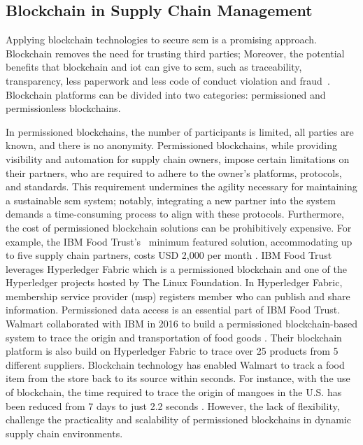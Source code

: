 \subsection{Blockchain in Supply Chain Management} \label{sec:lit_bc_in_scm}

Applying blockchain technologies to secure \gls{scm} is a promising approach. Blockchain removes the need for trusting third parties; Moreover, the potential benefits that blockchain and \gls{iot} can give to \gls{scm}, such as traceability, transparency, less paperwork and less code of conduct violation and fraud~\cite{Aich2019}.  Blockchain platforms can be divided into two categories: permissioned and permissionless blockchains. 

In permissioned blockchains, the number of participants is limited, all parties are known, and there is no anonymity. Permissioned blockchains, while providing visibility and automation for supply chain owners, impose certain limitations on their partners, who are required to adhere to the owner's platforms, protocols, and standards. This requirement undermines the agility necessary for maintaining a sustainable \gls{scm} system; notably, integrating a new partner into the system demands a time-consuming process to align with these protocols. Furthermore, the cost of permissioned blockchain solutions can be prohibitively expensive. For example, the IBM Food Trust's~\cite{IBM-SCM}  minimum featured solution, accommodating up to five supply chain partners, costs USD 2,000 per month \cite{IBMFoodTrust}. 
 IBM Food Trust leverages Hyperledger Fabric \cite{Fabric} which is a permissioned blockchain and one of the Hyperledger projects hosted by The Linux Foundation. In Hyperledger Fabric, membership service provider (\gls{msp}) registers member who can publish and share information. Permissioned data access is an essential part of IBM Food Trust. Walmart collaborated with IBM in 2016 to build a permissioned blockchain-based system to trace the origin and transportation of food goods \cite{HELO2019242}. Their blockchain platform is also build on Hyperledger Fabric to trace over 25 products from 5 different suppliers. Blockchain technology has enabled Walmart to track a food item from the store back to its source within seconds. For instance, with the use of blockchain, the time required to trace the origin of mangoes in the U.S. has been reduced from 7 days to just 2.2 seconds \cite{Walmart}.  However, the lack of flexibility, challenge the practicality and scalability of permissioned blockchains in dynamic supply chain environments.


